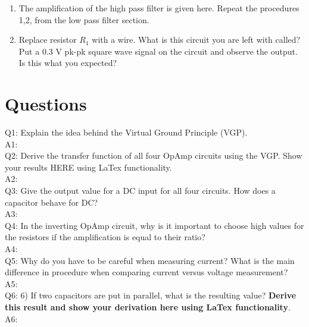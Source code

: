 \documentclass[11pt,letterpaper]{article}
\begin{document}
\begin{enumerate}
\item The amplification of the high pass filter is given here. Repeat the procedures 1,2, from the low pass filter section.
\item Replace resistor $R_1$ with a wire. What is this circuit you are left with called? Put a 0.3 V pk-pk square wave signal on the circuit and observe the output. Is this what you expected?
\end{enumerate}

\section{Questions}

Q1: Explain the idea behind the Virtual Ground Principle (VGP).\\
A1:\\


Q2: Derive the transfer function of all four OpAmp circuits using the VGP. Show your results HERE using LaTex functionality.\\
A2:\\

Q3: Give the output value for a DC input for all four circuits. How does a capacitor behave for DC?\\
A3:\\


Q4: In the inverting OpAmp circuit, why is it important to choose high values for the resistors if the amplification is equal to their ratio?\\
A4:\\

Q5: Why do you have to be careful when measuring current? What is the main difference in procedure when comparing current versus voltage measurement?\\
A5:\\


Q6: 6)	If two capacitors are put in parallel, what is the resulting value? \textbf{Derive this result and show your derivation here using LaTex functionality}.\\
A6:\\
\end{document}
